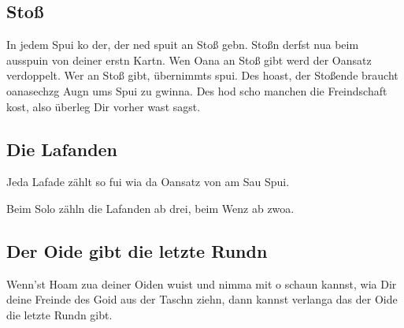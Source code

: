 \documentclass[11pt,a4paper]{scrartcl}		%
\begin{document}
		\subsection{Stoß}
		In jedem Spui ko der, der ned spuit an Stoß gebn. Stoßn derfst nua beim ausspuin von deiner erstn Kartn.
		Wen Oana an Stoß gibt werd der Oansatz verdoppelt.
	Wer an Stoß gibt, übernimmts spui. Des hoast, der Stoßende braucht oanasechzg Augn ums Spui zu gwinna. Des hod scho manchen die Freindschaft kost, also überleg Dir vorher wast sagst.


		\subsection{Die Lafanden}
		Jeda Lafade zählt so fui wia da Oansatz von am Sau Spui. 

		Beim Solo zähln die Lafanden ab drei, beim Wenz ab zwoa.







\subsection{Der Oide gibt die letzte Rundn}
Wenn'st Hoam zua deiner Oiden wuist und nimma mit o schaun kannst, wia Dir deine Freinde des Goid aus der Taschn ziehn, dann kannst verlanga das der Oide die letzte Rundn gibt. 
\end{document}
